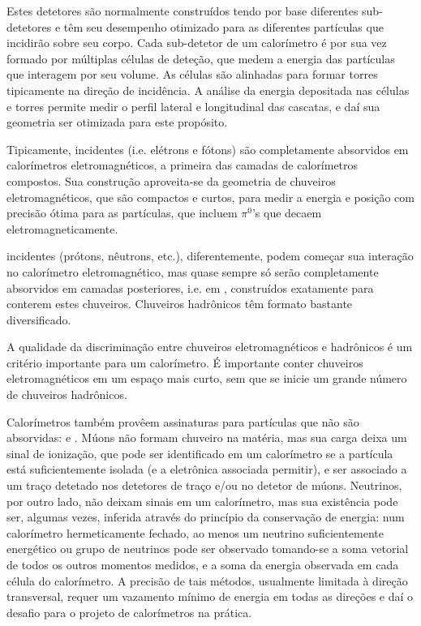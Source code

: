 Estes detetores são normalmente construídos tendo por base diferentes
sub-detetores e têm seu desempenho otimizado para as diferentes partículas que
incidirão sobre seu corpo. Cada sub-detetor de um calorímetro é por sua vez
formado por múltiplas células de deteção, que medem a energia das partículas
que interagem por seu volume. As células são alinhadas para formar torres
tipicamente na direção de incidência. A análise da energia depositada nas
células e torres permite medir o perfil lateral e longitudinal das cascatas, e
daí sua geometria ser otimizada para este propósito.

Tipicamente,  incidentes (i.e. elétrons e
fótons) são completamente absorvidos em calorímetros eletromagnéticos, a
primeira das camadas de calorímetros compostos. Sua construção aproveita-se da
geometria de chuveiros eletromagnéticos, que são compactos e curtos, para
medir a energia e posição com precisão ótima para as partículas, que
incluem $\pi^{0}$'s que decaem eletromagneticamente.

 incidentes (prótons, nêutrons, etc.), diferentemente,
podem começar sua interação no calorímetro eletromagnético, mas quase sempre
só serão completamente absorvidos em camadas posteriores, i.e. em
, construídos exatamente para conterem estes
chuveiros. Chuveiros hadrônicos têm formato bastante diversificado.

A qualidade da discriminação entre chuveiros eletromagnéticos e hadrônicos é
um critério importante para um calorímetro. É importante conter chuveiros
eletromagnéticos em um espaço mais curto, sem que se inicie um grande número
de chuveiros hadrônicos.

Calorímetros também provêem assinaturas para partículas que não são absorvidas:
 e . Múons não formam chuveiro na matéria, mas sua
carga deixa um sinal de ionização, que pode ser identificado em um calorímetro
se a partícula está suficientemente isolada (e a eletrônica associada
permitir), e ser associado a um traço detetado nos detetores de traço e/ou no
detetor de múons. Neutrinos, por outro lado, não deixam sinais em um
calorímetro, mas sua existência pode ser, algumas vezes, inferida através do
princípio da conservação de energia: num calorímetro hermeticamente fechado,
ao menos um neutrino suficientemente energético ou grupo de neutrinos pode ser
observado tomando-se a soma vetorial de todos os outros momentos medidos, e a
soma da energia observada em cada célula do calorímetro. A precisão de tais
métodos, usualmente limitada à direção transversal, requer um vazamento mínimo
de energia em todas as direções e daí o desafio para o projeto de calorímetros
na prática.

